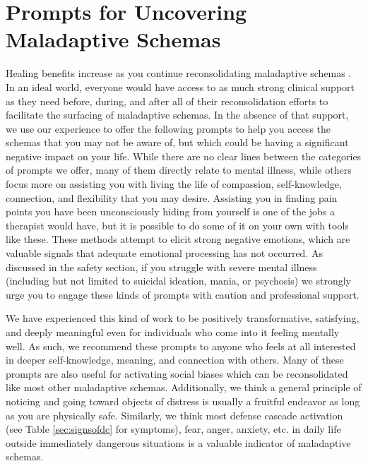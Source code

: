 \documentclass[12pt,letterpaper]{book}
\begin{document}
\section{Prompts for Uncovering Maladaptive Schemas}
\label{uncovering}
Healing benefits increase as you continue reconsolidating maladaptive schemas \cite{eckerUnlocking}. In an ideal world, everyone would have access to as much strong clinical support as they need before, during, and after all of their reconsolidation efforts to facilitate the surfacing of maladaptive schemas. In the absence of that support, we use our experience to offer the following prompts to help you access the schemas that you may not be aware of, but which could be having a significant negative impact on your life. While there are no clear lines between the categories of prompts we offer, many of them directly relate to mental illness, while others focus more on assisting you with living the life of compassion, self-knowledge, connection, and flexibility that you may desire. Assisting you in finding pain points you have been unconsciously hiding from yourself is one of the jobs a therapist would have, but it is possible to do some of it on your own with tools like these. These methods attempt to elicit strong negative emotions, which are valuable signals that adequate emotional processing has not occurred. As discussed in the safety section, if you struggle with severe mental illness (including but not limited to suicidal ideation, mania, or psychosis) we strongly urge you to engage these kinds of prompts with caution and professional support.

We have experienced this kind of work to be positively transformative, satisfying, and deeply meaningful even for individuals who come into it feeling mentally well. As such, we recommend these prompts to anyone who feels at all interested in deeper self-knowledge, meaning, and connection with others. Many of these prompts are also useful for activating social biases which can be reconsolidated like most other maladaptive schemas. Additionally, we think a general principle of noticing and going toward objects of distress is usually a fruitful endeavor as long as you are physically safe. Similarly, we think most defense cascade activation (see Table \ref{sec:signsofdc} for symptoms), fear, anger, anxiety, etc. in daily life outside immediately dangerous situations is a valuable indicator of maladaptive schemas.
\end{document}
